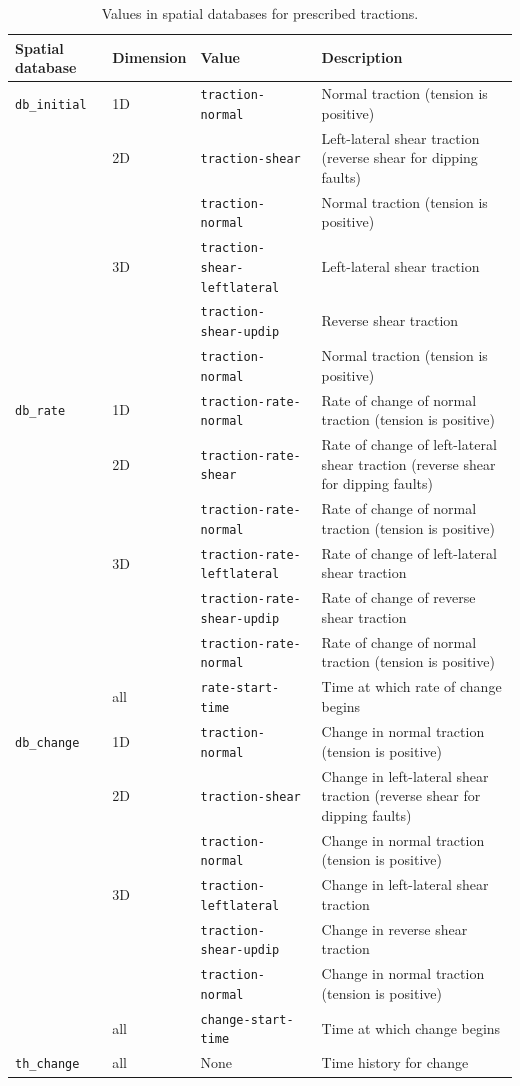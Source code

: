 \begin{table}[htbp]
\caption{Values in spatial databases for prescribed tractions.}
\label{tab:fault:cohesive:dyn:prescribed:tractions}
\begin{tabular}{lllp{2.5in}}
\textbf{Spatial database} & \textbf{Dimension} & \textbf{Value} & \textbf{Description}\\
\hline 
\texttt{db\_initial} & 1D & \texttt{traction-normal} & Normal traction (tension is positive)\\
 & 2D & \texttt{traction-shear} & Left-lateral shear traction (reverse shear for dipping faults)\\
 &  & \texttt{traction-normal} & Normal traction (tension is positive)\\
 & 3D & \texttt{traction-shear-leftlateral} & Left-lateral shear traction\\
 &  & \texttt{traction-shear-updip} & Reverse shear traction\\
 &  & \texttt{traction-normal} & Normal traction (tension is positive)\\
\texttt{db\_rate} & 1D & \texttt{traction-rate-normal} & Rate of change of normal traction (tension is positive)\\
 & 2D & \texttt{traction-rate-shear} & Rate of change of left-lateral shear traction (reverse shear for dipping
faults)\\
 &  & \texttt{traction-rate-normal} & Rate of change of normal traction (tension is positive)\\
 & 3D & \texttt{traction-rate-leftlateral} & Rate of change of left-lateral shear traction\\
 &  & \texttt{traction-rate-shear-updip} & Rate of change of reverse shear traction\\
 &  & \texttt{traction-rate-normal} & Rate of change of normal traction (tension is positive)\\
 & all & \texttt{rate-start-time} & Time at which rate of change begins\\
\texttt{db\_change} & 1D & \texttt{traction-normal} & Change in normal traction (tension is positive)\\
 & 2D & \texttt{traction-shear} & Change in left-lateral shear traction (reverse shear for dipping faults)\\
 &  & \texttt{traction-normal} & Change in normal traction (tension is positive)\\
 & 3D & \texttt{traction-leftlateral} & Change in left-lateral shear traction\\
 &  & \texttt{traction-shear-updip} & Change in reverse shear traction\\
 &  & \texttt{traction-normal} & Change in normal traction (tension is positive)\\
 & all & \texttt{change-start-time} & Time at which change begins\\
\texttt{th\_change} & all & None & Time history for change\\
\hline 
\end{tabular}
\end{table}

